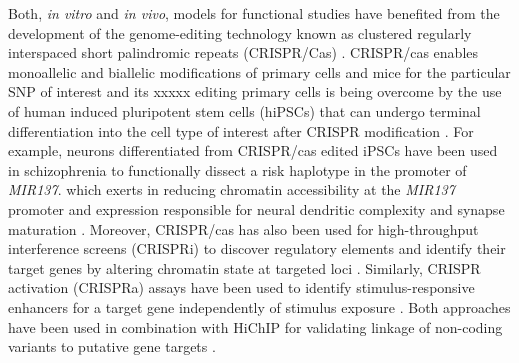 Both, \textit{in vitro} and \textit{in vivo}, models for functional studies have benefited from the development of the genome-editing technology known as clustered regularly interspaced short palindromic repeats (CRISPR/Cas) \parencite{Cong2013}. CRISPR/cas enables monoallelic and biallelic modifications of primary cells and mice for the particular SNP of interest and its  xxxxx editing primary cells is being overcome by the use of human induced pluripotent stem cells (hiPSCs) that can undergo terminal differentiation into the cell type of interest after CRISPR modification \parencite{Ding2013}. For example, neurons differentiated from CRISPR/cas edited iPSCs have been used in schizophrenia to functionally dissect a risk haplotype in the promoter of \textit{MIR137}.  which exerts in reducing chromatin accessibility at the \textit{MIR137} promoter and expression responsible for neural dendritic complexity and synapse maturation \parencite{Forrest2017}. Moreover, CRISPR/cas has also been used for high-throughput interference screens (CRISPRi) to discover regulatory elements and identify their target genes by altering chromatin state at targeted loci . Similarly, CRISPR activation (CRISPRa) assays have been used to identify stimulus-responsive enhancers for a target gene independently of stimulus exposure \parencite{Simeonov2017}. Both approaches have been used in combination with HiChIP for validating linkage of non-coding variants to putative gene targets \parencite{Mumbach2017}.





